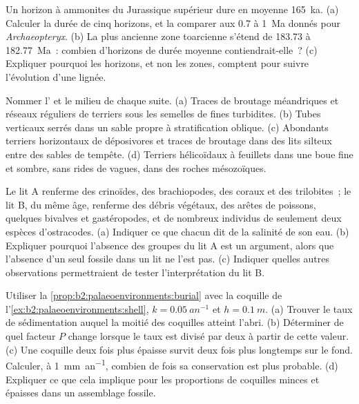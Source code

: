 \begin{exercise}[$\star$]\label{exo:b2:palaeoenvironments:2}
Un horizon à ammonites du Jurassique supérieur dure en moyenne \qty{165}{ka}. (a) Calculer la durée de
cinq horizons, et la comparer aux 0.7 à 1~Ma donnés pour \emph{Archaeopteryx}. (b) La plus ancienne zone
toarcienne s'étend de 183.73 à \qty{182.77}{Ma}~: combien d'horizons de durée moyenne contiendrait-elle~?
(c) Expliquer pourquoi les horizons, et non les zones, comptent pour suivre l'évolution d'une lignée.
\end{exercise}

\begin{exercise}[$\star$]\label{exo:b2:palaeoenvironments:3}
Nommer l' et le milieu de chaque suite. (a) Traces de broutage méandriques et réseaux
réguliers de terriers sous les semelles de fines turbidites. (b) Tubes verticaux serrés dans
un sable propre à stratification oblique. (c) Abondants terriers horizontaux de déposivores et
traces de broutage dans des lits silteux entre des sables de tempête. (d) Terriers hélicoïdaux
à feuillets dans une boue fine et sombre, sans rides de vagues, dans des roches mésozoïques.
\end{exercise}

\begin{exercise}[$\star$]\label{exo:b2:palaeoenvironments:4}
Le lit A renferme des crinoïdes, des brachiopodes, des coraux et des trilobites~; le lit B, du même âge,
renferme des débris végétaux, des arêtes de poissons, quelques bivalves et gastéropodes, et de nombreux individus
de seulement deux espèces d'ostracodes. (a) Indiquer ce que chacun dit de la salinité de son eau. (b) Expliquer
pourquoi l'absence des groupes du lit A est un argument, alors que l'absence d'un seul fossile dans un
lit ne l'est pas. (c) Indiquer quelles autres observations permettraient de tester l'interprétation du lit B.
\end{exercise}

\begin{exercise}[$\star\star$]\label{exo:b2:palaeoenvironments:5}
Utiliser la \cref{prop:b2:palaeoenvironments:burial} avec la coquille de l'\cref{ex:b2:palaeoenvironments:shell},
$k = \qty{0.05}{an^{-1}}$ et $h = \qty{0.1}{m}$. (a) Trouver le taux de sédimentation auquel la
moitié des coquilles atteint l'abri. (b) Déterminer de quel facteur $P$ change lorsque le taux est divisé
par deux à partir de cette valeur. (c) Une coquille deux fois plus épaisse survit deux fois plus longtemps
sur le fond. Calculer, à \qty{1}{mm.an^{-1}}, combien de fois sa conservation est plus probable. (d) Expliquer
ce que cela implique pour les proportions de coquilles minces et épaisses dans un assemblage fossile.
\end{exercise}

